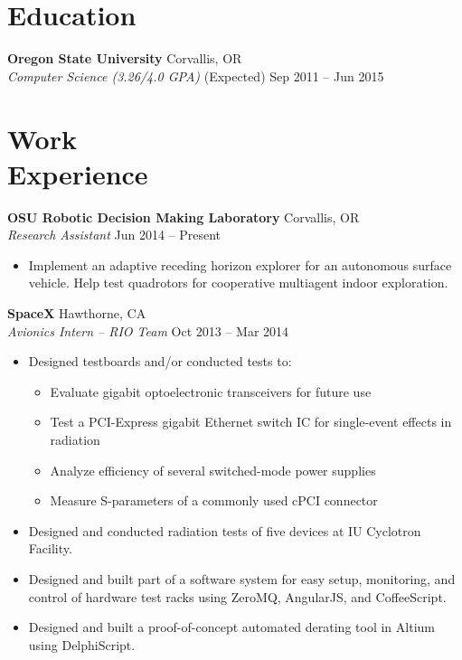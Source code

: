 \documentclass[10pt,letterpaper,margin]{res}
\begin{document}
\begin{resume}

\section{Education}

{\bf Oregon State University} \hfill {\color{lightgray} Corvallis, OR} \\
{\it Computer Science (3.26/4.0 GPA)} \hfill {\color{lightgray} (Expected) Sep 2011 -- Jun 2015}\vspace{0.0em}


\section{Work \\ Experience}

{\bf OSU Robotic Decision Making Laboratory} \hfill {\color{lightgray} Corvallis, OR} \\
{\it Research Assistant} \hfill {\color{lightgray} Jun 2014 -- Present}\vspace{0.0em}

\begin{itemize}
	\item Implement an adaptive receding horizon explorer for an autonomous
		surface vehicle. Help test quadrotors for cooperative multiagent indoor
		exploration.
\end{itemize}


{\bf SpaceX} \hfill {\color{lightgray} Hawthorne, CA} \\
{\it Avionics Intern -- RIO Team} \hfill {\color{lightgray} Oct 2013 -- Mar 2014}\vspace{0.0em}

\begin{itemize}
	\item Designed testboards and/or conducted tests to:
		\begin{itemize}
			\item Evaluate gigabit optoelectronic transceivers for future use
			\item Test a PCI-Express gigabit Ethernet switch IC for
				single-event effects in radiation
			\item Analyze efficiency of several switched-mode power supplies
			\item Measure S-parameters of a commonly used cPCI connector
		\end{itemize}
	\item Designed and conducted radiation tests of five devices at IU
		Cyclotron Facility.
	\item Designed and built part of a software system for easy setup,
		monitoring, and control of hardware test racks using ZeroMQ, AngularJS,
		and CoffeeScript.
	\item Designed and built a proof-of-concept automated derating tool in
		Altium using DelphiScript.
\end{itemize}



\end{resume}
\end{document}
